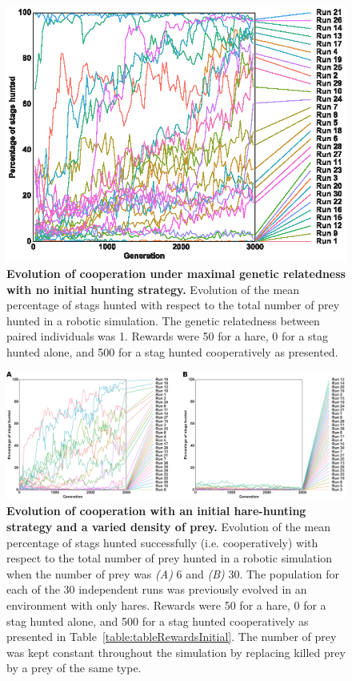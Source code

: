   \begin{figure}[h]
    \centering
      \includegraphics[scale = 1.0]{fig/ArticleBio1/S2_Fig.eps}
    \caption{\textbf{Evolution of cooperation under maximal genetic relatedness with no initial hunting strategy.}
    Evolution of the mean percentage of stags hunted with respect to the total number of prey hunted in a robotic simulation. The genetic relatedness between paired individuals was 1. Rewards were 50 for a hare, 0 for a stag hunted alone, and 500 for a stag hunted cooperatively as presented.}
    \label{fig:S2_Fig}
  \end{figure}

  \begin{figure}[h]
    \centerfloat
      \includegraphics[scale = 1.0]{fig/ArticleBio1/S3_Fig.png}
    \caption{\textbf{Evolution of cooperation with an initial hare-hunting strategy and a varied density of prey.} 
    Evolution of the mean percentage of stags hunted successfully (i.e. cooperatively) with respect to the total number of prey hunted in a robotic simulation when the number of prey was {\em (A)} $6$ and {\em (B)} $30$. The population for each of the 30 independent runs was previously evolved in an environment with only hares. Rewards were 50 for a hare, 0 for a stag hunted alone, and 500 for a stag hunted cooperatively as presented in Table~\ref{table:tableRewardsInitial}. The number of prey was kept constant throughout the simulation by replacing killed prey by a prey of the same type.}
    \label{fig:S3_Fig}
  \end{figure}
